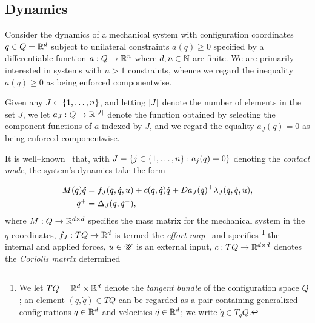 \documentclass{article}
\begin{document}
\subsection{Dynamics}
\label{sec:dyn}
Consider the dynamics of a mechanical system with configuration coordinates $q\in Q=\mathbb{R}^d$ subject to 
unilateral constraints $a(q) \ge 0$ 
specified by a differentiable function 
$a : Q\rightarrow \mathbb{R}^n$
where $d,n\in\mathbb{N}$ are finite.
We are primarily interested in systems with $n > 1$ constraints,  
whence we regard the inequality $a(q) \ge 0$ as being enforced componentwise.

Given any $J\subset\left\{ 1,\dots,n \right\}$, 
and letting $\left| J \right|$ denote the number of elements in the set $J$,
we let 
$a_J : Q \rightarrow \mathbb{R}^{\left| J \right|}$ 
denote the function obtained by selecting the component functions of $a$ indexed by $J$, 
and we regard the equality $a_J(q) = 0$ as being enforced componentwise.

It is well--known~
that, with
$J = \left\{ j\in\left\{ 1,\dots,n \right\} : a_j(q) = 0 \right\}$ 
denoting the \emph{contact mode},
the system's dynamics take the form

\begin{subequations}\label{eq:dyn}
\begin{align}
  M(q)\ddot{q} & = f_J(q,\dot{q},u) + c(q,\dot{q})\dot{q} + Da_J(q)^\top \lambda_J(q,\dot{q},u),\label{eq:dyn:cont}\\
  \dot{q}^+ & = \Delta_J(q,\dot{q}^-),\label{eq:dyn:disc}
\end{align}
\end{subequations}
where
$M : Q \rightarrow \mathbb{R}^{d\times d}$
specifies the mass matrix for the mechanical system in the $q$ coordinates,
$f_J : TQ \rightarrow \mathbb{R}^d$ 
is termed the \emph{effort map}~\cite{Ballard2000-ui}
and specifies%
\footnote{We let $TQ = \mathbb{R}^d\times\mathbb{R}^d$ denote the \emph{tangent bundle} of the configuration space $Q$; an element $(q,\dot{q})\in TQ$ can be regarded as a pair containing generalized configurations $q\in\mathbb{R}^d$ and velocities $\dot{q}\in\mathbb{R}^d$; we write $\dot{q}\in T_q Q$.}
the internal and applied
forces, 
$u\in\mathscr{U}$ is an external input,
$c : TQ \rightarrow \mathbb{R}^{d\times d}$ 
denotes the \emph{Coriolis matrix} 
determined
\end{document}
